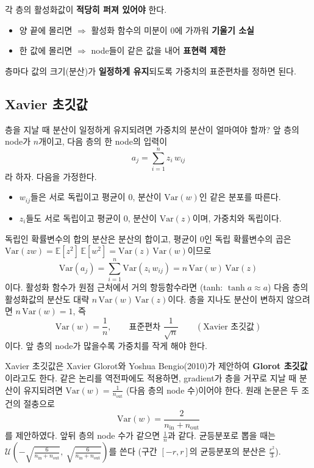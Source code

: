\documentclass[11pt,a4paper]{article}
\begin{document}
\begin{keybox}
각 층의 활성화값이 \textbf{적당히 퍼져 있어야} 한다.
\begin{itemize}[leftmargin=1.5em]
\item 양 끝에 몰리면 $\Rightarrow$ 활성화 함수의 미분이 $0$에 가까워 \textbf{기울기 소실}
\item 한 값에 몰리면 $\Rightarrow$ node들이 같은 값을 내어 \textbf{표현력 제한}
\end{itemize}
층마다 값의 크기(분산)가 \textbf{일정하게 유지}되도록 가중치의 표준편차를 정하면 된다.
\end{keybox}

\subsection{Xavier 초깃값}\label{sec:xavier}

층을 지날 때 분산이 일정하게 유지되려면 가중치의 분산이 얼마여야 할까?
앞 층의 node가 $n$개이고, 다음 층의 한 node의 입력이
\[
a_j=\sum_{i=1}^{n}z_i\,w_{ij}
\]
라 하자. 다음을 가정한다.
\begin{itemize}[leftmargin=1.8em]
\item $w_{ij}$들은 서로 독립이고 평균이 $0$, 분산이 $\mathrm{Var}(w)$인 같은 분포를 따른다.
\item $z_i$들도 서로 독립이고 평균이 $0$, 분산이 $\mathrm{Var}(z)$이며, 가중치와 독립이다.
\end{itemize}
독립인 확률변수의 합의 분산은 분산의 합이고, 평균이 $0$인 독립 확률변수의 곱은
$\mathrm{Var}(zw)=\mathbb E[z^2]\,\mathbb E[w^2]=\mathrm{Var}(z)\,\mathrm{Var}(w)$이므로
\[
\mathrm{Var}(a_j)=\sum_{i=1}^{n}\mathrm{Var}(z_i\,w_{ij})=n\,\mathrm{Var}(w)\,\mathrm{Var}(z)
\]
이다. 활성화 함수가 원점 근처에서 거의 항등함수라면 (tanh: $\tanh a\approx a$)
다음 층의 활성화값의 분산도 대략 $n\,\mathrm{Var}(w)\,\mathrm{Var}(z)$이다.
층을 지나도 분산이 변하지 않으려면 $n\,\mathrm{Var}(w)=1$, 즉
\[
\boxed{
\mathrm{Var}(w)=\frac{1}{n},
\qquad
\text{표준편차 }\frac{1}{\sqrt n}
\qquad(\text{Xavier 초깃값})
}
\]
이다. 앞 층의 node가 많을수록 가중치를 작게 해야 한다.

\begin{remarkbox}
Xavier 초깃값은 Xavier Glorot와 Yoshua Bengio(2010)가 제안하여 \textbf{Glorot 초깃값}이라고도 한다.
같은 논리를 역전파에도 적용하면, gradient가 층을 거꾸로 지날 때 분산이 유지되려면
$\mathrm{Var}(w)=\frac{1}{n_{\mathrm{out}}}$ (다음 층의 node 수)이어야 한다.
원래 논문은 두 조건의 절충으로
\[
\mathrm{Var}(w)=\frac{2}{n_{\mathrm{in}}+n_{\mathrm{out}}}
\]
를 제안하였다. 앞뒤 층의 node 수가 같으면 $\frac1n$과 같다.
균등분포로 뽑을 때는 $\mathcal U\!\left(-\sqrt{\frac{6}{n_{\mathrm{in}}+n_{\mathrm{out}}}},\ \sqrt{\frac{6}{n_{\mathrm{in}}+n_{\mathrm{out}}}}\right)$를 쓴다
(구간 $[-r,r]$의 균등분포의 분산은 $\frac{r^2}{3}$).
\end{remarkbox}
\end{document}
